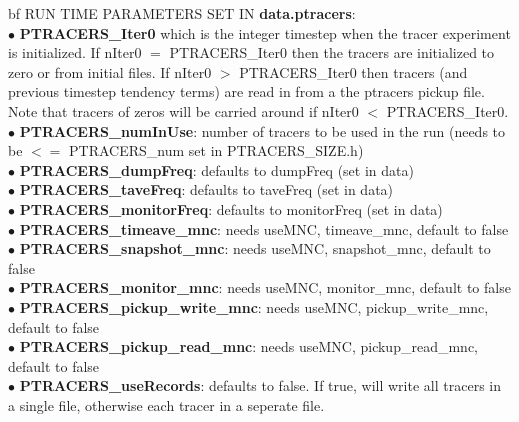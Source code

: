 \noindent
{bf RUN TIME PARAMETERS  SET IN {\bf data.ptracers}}: \\
$\bullet$ {\bf PTRACERS\_Iter0} 
which is the integer timestep when the tracer experiment
 is initialized. If  nIter0 $=$  PTRACERS\_Iter0 then the tracers
 are initialized to zero or from initial files. If nIter0 $>$
  PTRACERS\_Iter0 then tracers (and previous timestep tendency terms)
  are read in from a the ptracers pickup file. Note that tracers
  of zeros will be carried around if nIter0 $<$  PTRACERS\_Iter0.\\
$\bullet$ {\bf PTRACERS\_numInUse}: number of tracers to be used in the
run (needs to be $<=$ PTRACERS\_num set in PTRACERS\_SIZE.h)\\
$\bullet$  {\bf PTRACERS\_dumpFreq}: defaults to dumpFreq (set in data)\\
$\bullet$  {\bf PTRACERS\_taveFreq}: defaults to taveFreq (set in data)\\
$\bullet$  {\bf PTRACERS\_monitorFreq}: defaults to monitorFreq (set in data)\\
$\bullet$  {\bf PTRACERS\_timeave\_mnc}: needs useMNC, timeave\_mnc, default to false\\
$\bullet$  {\bf PTRACERS\_snapshot\_mnc}:  needs useMNC, snapshot\_mnc, default to false \\
$\bullet$  {\bf PTRACERS\_monitor\_mnc}: needs useMNC, monitor\_mnc, default to false\\
$\bullet$  {\bf PTRACERS\_pickup\_write\_mnc}:  needs useMNC, pickup\_write\_mnc, default to false\\
$\bullet$  {\bf PTRACERS\_pickup\_read\_mnc}: needs useMNC, pickup\_read\_mnc, default to false\\
$\bullet$  {\bf PTRACERS\_useRecords}: defaults to false. If true, will write 
all tracers in a single file, otherwise each tracer in a seperate file.\\

\vspace{.5cm}

